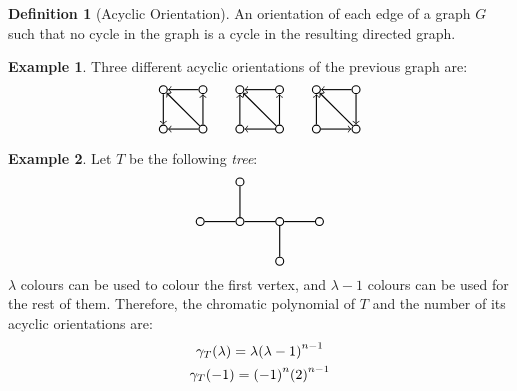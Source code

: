 \documentclass[svgnames]{article}
\theoremstyle{definition}
\newtheorem{Definition}{Definition}
\newtheorem*{Example*}{Example}
\theoremstyle{remark}
\theoremstyle{underline}
\theoremstyle{underline}
\begin{document}
	\begin{Definition}[Acyclic Orientation]
		An orientation of each edge of a graph $G$ such that no cycle in the graph is a cycle in the resulting directed graph.
	\end{Definition}
	\begin{Example*}
		Three different acyclic orientations of the previous graph are:
		\begin{gather*}
			\tikz[baseline=(current bounding box.center),scale=1,auto=left,every node/.style={circle,draw=black,thick,inner sep=0pt,minimum size=2mm}]
			{
				\node (n1) at (0,1)	{};
				\node (n2) at (0,0)	{};
				\node (n3) at (1,1)	{};
				\node (n4) at (1,0)	{};
				\foreach \from/\to in {n1/n2, n3/n1, n4/n1, n4/n2, n4/n3}
				\draw[->,thick] (\from) -- (\to);
			} \hspace{20pt}
			\tikz[baseline=(current bounding box.center),scale=1,auto=left,every node/.style={circle,draw=black,thick,inner sep=0pt,minimum size=2mm}]
			{
				\node (n1) at (0,1)	{};
				\node (n2) at (0,0)	{};
				\node (n3) at (1,1)	{};
				\node (n4) at (1,0)	{};
				\foreach \from/\to in {n2/n1, n3/n1, n4/n1, n4/n2, n4/n3}
				\draw[->,thick] (\from) -- (\to);
			} \hspace{20pt}
			\tikz[baseline=(current bounding box.center),scale=1,auto=left,every node/.style={circle,draw=black,thick,inner sep=0pt,minimum size=2mm}]
			{
				\node (n1) at (0,1)	{};
				\node (n2) at (0,0)	{};
				\node (n3) at (1,1)	{};
				\node (n4) at (1,0)	{};
				\foreach \from/\to in {n2/n1, n3/n1, n4/n1, n2/n4, n3/n4}
				\draw[->,thick] (\from) -- (\to);
			}
		\end{gather*}
	\end{Example*}
	\begin{Example*}
		Let $T$ be the following \emph{tree}:
		\begin{gather*}
			\tikz[baseline=(current bounding box.center),scale=1,auto=left,every node/.style={circle,draw=black,thick,inner sep=0pt,minimum size=2mm}]
			{
				\node (n1) at (0,0) {};
				\node (n2) at (1,0)	{};
				\node (n3) at (1,1)	{};
				\node (n4) at (2,0)	{};
				\node (n5) at (2,-1) {};
				\node (n6) at (3,0) {};
				\foreach \from/\to in {n1/n2, n2/n3, n2/n4, n4/n5, n4/n6}
				\draw[thick] (\from) -- (\to);
			} 	
		\end{gather*}
		$\lambda$ colours can be used to colour the first vertex, and $\lambda - 1$ colours can be used for the rest of them. Therefore, the chromatic polynomial of $T$ and the number of its acyclic orientations are:
		\begin{gather*}
			\gamma_{T}\pqty{\lambda} = \lambda\pqty{\lambda - 1}^{n-1} \\
			\gamma_{T}\pqty{-1} = \pqty{-1}^n \pqty{2}^{n-1}
		\end{gather*}
	\end{Example*}
\end{document}

